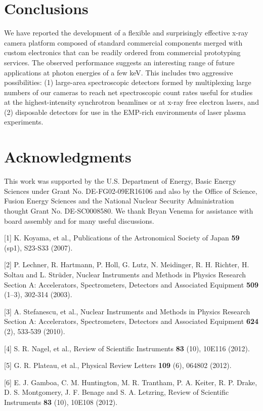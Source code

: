 \FloatBarrier

\section{Conclusions}
We have reported the development of a flexible and
surprisingly effective x-ray camera platform composed of standard
commercial components merged with custom electronics that can be readily
ordered from commercial prototyping services. The observed performance
suggests an interesting range of future applications at photon energies
of a few keV. This includes two aggressive possibilities: (1) large-area
spectroscopic detectors formed by multiplexing large numbers of our
cameras to reach net spectroscopic count rates useful for studies at the
highest-intensity synchrotron beamlines or at x-ray free electron
lasers, and (2) disposable detectors for use in the EMP-rich
environments of laser plasma experiments.

\section*{Acknowledgments}
This work was supported by the U.S.
Department of Energy, Basic Energy Sciences under Grant No.
DE-FG02-09ER16106 and also by the Office of Science, Fusion Energy
Sciences and the National Nuclear Security Administration thought Grant
No. DE-SC0008580. We thank Bryan Venema for assistance with board
assembly and for many useful discussions.


{[}1{]} K. Koyama, et al., Publications of the
Astronomical Society of Japan \textbf{59} (sp1), S23-S33 (2007).

{[}2{]} P. Lechner, R. Hartmann, P. Holl, G.
Lutz, N. Meidinger, R. H. Richter, H. Soltau and L. Strüder, Nuclear
Instruments and Methods in Physics Research Section A: Accelerators,
Spectrometers, Detectors and Associated Equipment \textbf{509} (1--3),
302-314 (2003).

{[}3{]} A. Stefanescu, et al., Nuclear
Instruments and Methods in Physics Research Section A: Accelerators,
Spectrometers, Detectors and Associated Equipment \textbf{624} (2),
533-539 (2010).

{[}4{]} S. R. Nagel, et al., Review of
Scientific Instruments \textbf{83} (10), 10E116 (2012).

{[}5{]} G. R. Plateau, et al., Physical Review
Letters \textbf{109} (6), 064802 (2012).

{[}6{]} E. J. Gamboa, C. M. Huntington, M. R.
Trantham, P. A. Keiter, R. P. Drake, D. S. Montgomery, J. F. Benage and
S. A. Letzring, Review of Scientific Instruments \textbf{83} (10),
10E108 (2012).

